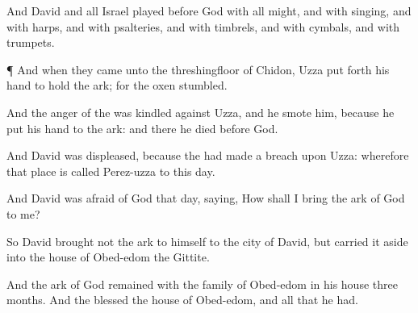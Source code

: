 {And
David and all
Israel
played
before
God with all
{}
might, and with
singing, and with
harps, and with
psalteries, and with
timbrels, and with
cymbals, and with
trumpets.


\par }{\PP {}¶ And when they
came unto the
threshingfloor of
Chidon,
Uzza put
forth his
hand to
hold the
ark; for the
oxen
stumbled.

And the
anger of the
{} was
kindled against
Uzza, and he
smote him, because he
put his
hand to the
ark: and there he
died
before
God.

And
David was
displeased, because the
{} had
made a
breach upon
Uzza: wherefore that
place is
called
Perez-uzza to this
day.

And
David was
afraid of
God that
day,
saying,
How shall I
bring the
ark of
God
{} to me?

So
David
brought not the
ark
{} to himself to the
city of
David, but carried it
aside into the
house of
Obed-edom the
Gittite.

And the
ark of
God
remained with the
family of
Obed-edom in his
house
three
months. And the
{}
blessed the
house of
Obed-edom, and all that he had.




\par }
